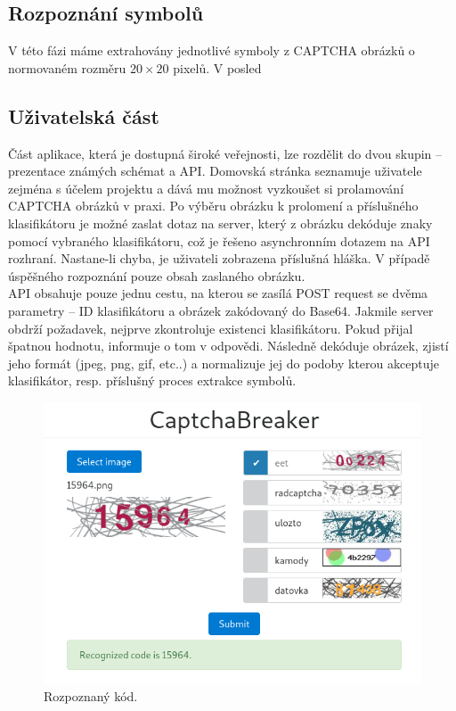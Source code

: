 \documentclass[
  field=ainfp,
  master=true,
  biblatex,
  sourcecodes=false,
  theorems=false,
  glossaries,
  index
]{kidiplom}
\begin{document}
\subsection{Rozpoznání symbolů}
V této fázi máme extrahovány jednotlivé symboly z CAPTCHA obrázků o normovaném rozměru $20\times20$ pixelů. V posled

\subsection{Uživatelská část}
Část aplikace, která je dostupná široké veřejnosti, lze rozdělit do dvou skupin -- prezentace známých schémat a API. Domovská stránka seznamuje uživatele zejména s účelem projektu a dává mu možnost vyzkoušet si prolamování CAPTCHA obrázků v praxi. Po výběru obrázku k prolomení a příslušného klasifikátoru je možné zaslat dotaz na server, který z obrázku dekóduje znaky pomocí vybraného klasifikátoru, což je řešeno asynchronním dotazem na API rozhraní. Nastane-li chyba, je uživateli zobrazena příslušná hláška. V případě úspěšného rozpoznání pouze obsah zaslaného obrázku.\\

API obsahuje pouze jednu cestu, na kterou se zasílá POST request se dvěma parametry -- ID klasifikátoru a obrázek zakódovaný do Base64. Jakmile server obdrží požadavek, nejprve zkontroluje existenci klasifikátoru. Pokud přijal špatnou hodnotu, informuje o tom v odpovědi. Následně dekóduje obrázek, zjistí jeho formát (jpeg, png, gif, etc..) a normalizuje jej do podoby kterou akceptuje klasifikátor, resp. příslušný proces extrakce symbolů.

\begin{figure}[H]
  \centering
  \includegraphics[scale=0.6]{images/website_public.png}
  \caption{Rozpoznaný kód.}
  \label{fig:captcha_geetest}
\end{figure}
\end{document}
